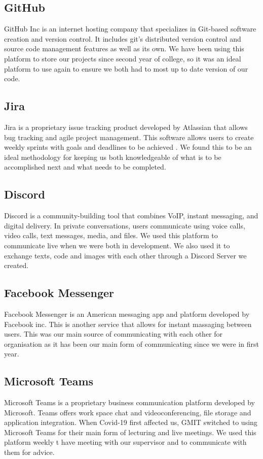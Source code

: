 \subsection{GitHub}
GitHub Inc is an internet hosting company that specializes in Git-based software creation and version control. It includes git's distributed version control and source code management features as well as its own.  We have been using this platform to store our projects since second year of college, so it was an ideal platform to use again to ensure we both had to most up to date version of our code.

\subsection{Jira}
Jira is a proprietary issue tracking product developed by Atlassian that allows bug tracking and agile project management. This software allows users to create weekly sprints with goals and deadlines to be achieved \cite{Jira}. We found this to be an ideal methodology for keeping us both knowledgeable of what is to be accomplished next and what needs to be completed.

\subsection{Discord}
Discord is a community-building tool that combines VoIP, instant messaging, and digital delivery.
In private conversations, users communicate using voice calls, video calls, text messages, media, and files. We used this platform to communicate live when we were both in development. We also used it to exchange texts, code and images with each other through a Discord Server we created.

\subsection{Facebook Messenger}
Facebook Messenger is an American messaging app and platform developed by Facebook inc. This is another service that allows for instant massaging between users. This was our main source of communicating with each other for organisation as it has been our main form of communicating since we were in first year.

\subsection{Microsoft Teams}
Microsoft Teams is a proprietary business communication platform developed by Microsoft. Teams offers work space chat and videoconferencing, file storage and application integration. When Covid-19 first affected us, GMIT switched to using Microsoft Teams for their main form of lecturing and live meetings. We used this platform weekly t have meeting with our supervisor and to communicate with them for advice.

